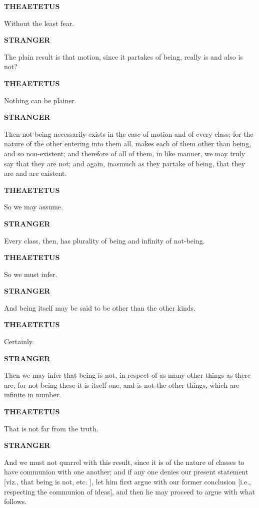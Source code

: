 \documentclass[11pt,letter]{article}
\begin{document}
\par \textbf{THEAETETUS}
\par   Without the least fear.

\par \textbf{STRANGER}
\par   The plain result is that motion, since it partakes of being, really is and also is not?

\par \textbf{THEAETETUS}
\par   Nothing can be plainer.

\par \textbf{STRANGER}
\par   Then not-being necessarily exists in the case of motion and of every class; for the nature of the other entering into them all, makes each of them other than being, and so non-existent; and therefore of all of them, in like manner, we may truly say that they are not; and again, inasmuch as they partake of being, that they are and are existent.

\par \textbf{THEAETETUS}
\par   So we may assume.

\par \textbf{STRANGER}
\par   Every class, then, has plurality of being and infinity of not-being.

\par \textbf{THEAETETUS}
\par   So we must infer.

\par \textbf{STRANGER}
\par   And being itself may be said to be other than the other kinds.

\par \textbf{THEAETETUS}
\par   Certainly.

\par \textbf{STRANGER}
\par   Then we may infer that being is not, in respect of as many other things as there are; for not-being these it is itself one, and is not the other things, which are infinite in number.

\par \textbf{THEAETETUS}
\par   That is not far from the truth.

\par \textbf{STRANGER}
\par   And we must not quarrel with this result, since it is of the nature of classes to have communion with one another; and if any one denies our present statement [viz., that being is not, etc. ], let him first argue with our former conclusion [i.e., respecting the communion of ideas], and then he may proceed to argue with what follows.
\end{document}
